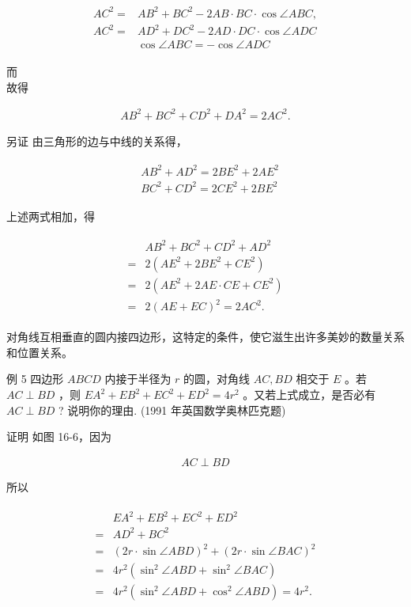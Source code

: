 \documentclass[10pt]{article}
\begin{document}
\begin{align*}
\begin{aligned}
A C^{2}= & A B^{2}+B C^{2}-2 A B \cdot B C \cdot \cos \angle A B C, \\
A C^{2}= & A D^{2}+D C^{2}-2 A D \cdot D C \cdot \cos \angle A D C \\
& \cos \angle A B C=-\cos \angle A D C
\end{aligned}
\end{align*}

而\\
故得

\begin{align*}
A B^{2}+B C^{2}+C D^{2}+D A^{2}=2 A C^{2} .
\end{align*}

另证 由三角形的边与中线的关系得，

\begin{align*}
\begin{aligned}
& A B^{2}+A D^{2}=2 B E^{2}+2 A E^{2} \\
& B C^{2}+C D^{2}=2 C E^{2}+2 B E^{2}
\end{aligned}
\end{align*}

上述两式相加，得

\begin{align*}
\begin{aligned}
& A B^{2}+B C^{2}+C D^{2}+A D^{2} \\
= & 2\left(A E^{2}+2 B E^{2}+C E^{2}\right) \\
= & 2\left(A E^{2}+2 A E \cdot C E+C E^{2}\right) \\
= & 2(A E+E C)^{2}=2 A C^{2} .
\end{aligned}
\end{align*}

对角线互相垂直的圆内接四边形，这特定的条件，使它滋生出许多美妙的数量关系和位置关系。

例 5 四边形 $A B C D$ 内接于半径为 $r$ 的圆，对角线 $A C, B D$ 相交于 $E$ 。若 $A C \perp B D$ ，则 $E A^{2}+E B^{2}+E C^{2}+E D^{2}=4 r^{2}$ 。又若上式成立，是否必有 $A C \perp B D$ ? 说明你的理由. (1991 年英国数学奥林匹克题)

证明 如图 16-6，因为

\begin{align*}
A C \perp B D
\end{align*}

所以

\begin{align*}
\begin{aligned}
& E A^{2}+E B^{2}+E C^{2}+E D^{2} \\
= & A D^{2}+B C^{2} \\
= & (2 r \cdot \sin \angle A B D)^{2}+(2 r \cdot \sin \angle B A C)^{2} \\
= & 4 r^{2}\left(\sin ^{2} \angle A B D+\sin ^{2} \angle B A C\right) \\
= & 4 r^{2}\left(\sin ^{2} \angle A B D+\cos ^{2} \angle A B D\right)=4 r^{2} .
\end{aligned}
\end{align*}
\end{document}
